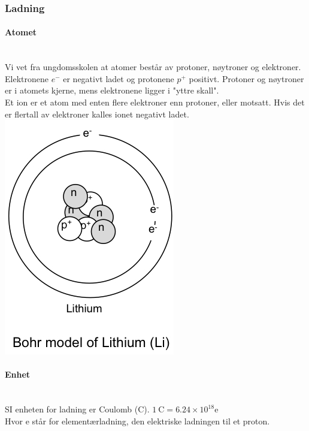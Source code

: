 \subsubsection{Ladning}
\paragraph{Atomet} \mbox{} \\
Vi vet fra ungdomsskolen at atomer består av protoner, nøytroner og elektroner.
Elektronene $e^-$ er negativt ladet og protonene $p^+$ positivt.
Protoner og nøytroner er i atomets kjerne, mens elektronene ligger i
"yttre skall".
\\
Et ion er et atom med enten flere elektroner enn protoner, eller motsatt.
Hvis det er flertall av elektroner kalles ionet negativt ladet.
\\
\includegraphics{./img/Li}

\paragraph{Enhet} \mbox{} \\
SI enheten for ladning er Coulomb (C). \hfill $\SI{1}{\coulomb} = 6.24 \times 10^{18}$e\\
Hvor e står for elementærladning, den elektriske ladningen til et proton.
